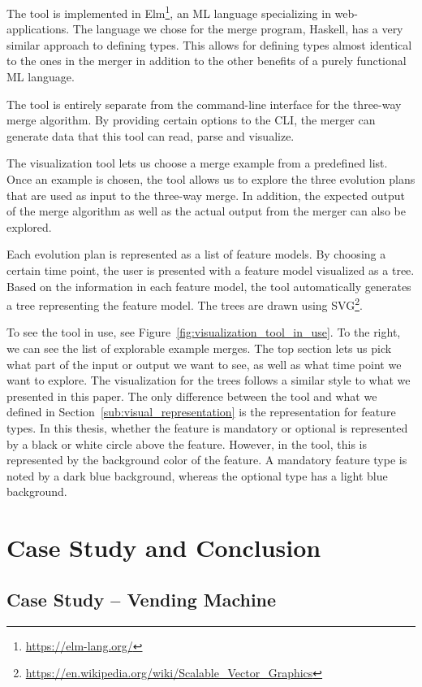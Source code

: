 \documentclass[a4paper,english]{ifimaster}
\begin{document}
The tool is implemented in Elm\footnote{\url{https://elm-lang.org/}}, an ML language specializing in web-applications. The language we chose for the merge program, Haskell, has a very similar approach to defining types. This allows for defining types almost identical to the ones in the merger in addition to the other benefits of a purely functional ML language.

The tool is entirely separate from the command-line interface for the three-way merge algorithm. By providing certain options to the CLI, the merger can generate data that this tool can read, parse and visualize.

The visualization tool lets us choose a merge example from a predefined list. Once an example is chosen, the tool allows us to explore the three evolution plans that are used as input to the three-way merge. In addition, the expected output of the merge algorithm as well as the actual output from the merger can also be explored.

Each evolution plan is represented as a list of feature models. By choosing a certain time point, the user is presented with a feature model visualized as a tree. Based on the information in each feature model, the tool automatically generates a tree representing the feature model. The trees are drawn using SVG\footnote{\url{https://en.wikipedia.org/wiki/Scalable\_Vector\_Graphics}}.

To see the tool in use, see Figure~\ref{fig:visualization_tool_in_use}. To the right, we can see the list of explorable example merges. The top section lets us pick what part of the input or output we want to see, as well as what time point we want to explore. The visualization for the trees follows a similar style to what we presented in this paper. The only difference between the tool and what we defined in Section~\vref{sub:visual_representation} is the representation for feature types. In this thesis, whether the feature is mandatory or optional is represented by a black or white circle above the feature. However, in the tool, this is represented by the background color of the feature. A mandatory feature type is noted by a dark blue background, whereas the optional type has a light blue background.

\part{Case Study and Conclusion}%
\label{prt:case_study_and_conclusion}

\chapter{Case Study – Vending Machine}%
\label{cha:case_study_vending_machine}
\end{document}
